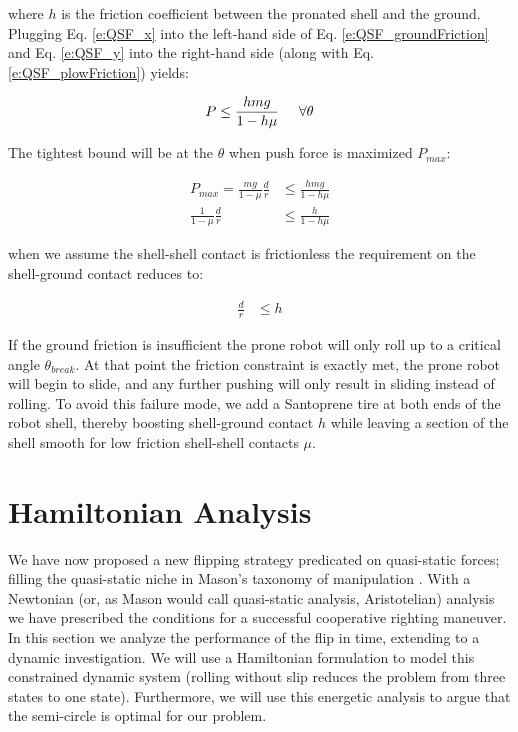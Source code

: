 \documentclass[letterpaper]{report}
\begin{document}
where $h$ is the friction coefficient between the pronated shell and the ground.
Plugging Eq. \ref{e:QSF_x} into the left-hand side of Eq. \ref{e:QSF_groundFriction} and Eq. \ref{e:QSF_y} into the right-hand side (along with Eq. \ref{e:QSF_plowFriction}) yields:

\begin{align}
  P \leq \frac{hmg}{1-h\mu} \label{e:QSF_pushConstraint1} \hspace{5mm} \forall \theta
\end{align}

The tightest bound will be at the $\theta$ when push force is maximized $P_{max}$:

\begin{align}
  P_{max} = \frac{mg}{1-\mu} \frac{d}{r} &\leq \frac{hmg}{1-h\mu} \\
  \frac{1}{1-\mu} \frac{d}{r} &\leq \frac{h}{1-h\mu}
  \label{e:gndFrictionReq}
\end{align}

when we assume the shell-shell contact is frictionless the requirement on the shell-ground contact reduces to:

\begin{align}
  \frac{d}{r} &\leq h
\end{align}

If the ground friction is insufficient the prone robot will only roll up to a critical angle $\theta_{break}$.
At that point the friction constraint is exactly met, the prone robot will begin to slide, and any further pushing will only result in sliding instead of rolling.
To avoid this failure mode, we add a Santoprene tire at both ends of the robot shell, thereby boosting shell-ground contact $h$ while leaving a section of the shell smooth for low friction shell-shell contacts $\mu$.

\section{Hamiltonian Analysis \label{sec:QS_HamAnalysis}}
We have now proposed a new flipping strategy predicated on quasi-static forces; filling the quasi-static niche in Mason's taxonomy of manipulation \cite{MasonMORMBook}.
With a Newtonian (or, as Mason would call quasi-static analysis, Aristotelian) analysis we have prescribed the conditions for a successful cooperative righting maneuver.
In this section we analyze the performance of the flip in time, extending to a dynamic investigation.
We will use a Hamiltonian formulation to model this constrained dynamic system (rolling without slip reduces the problem from three states to one state).
Furthermore, we will use this energetic analysis to argue that the semi-circle is optimal for our problem.
\end{document}
